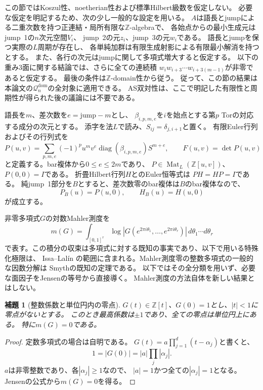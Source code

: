 \documentclass[11pt,a4paper]{ltjsarticle}
\newtheorem{lemma}[theorem]{補題}
\theoremstyle{definition}
\begin{document}
この節ではKoszul性、noetherian性および標準Hilbert級数を仮定しない。
必要な仮定を明記するため、次の少し一般的な設定を用いる。
$A$は語長とjumpによる二重次数を持つ正連結・局所有限な$\mathbb Z$-algebraで、
各始点からの最小生成元はjump~1の$n$次元空間$V_i$、
jump~2の元$z_i$、jump~3の元$w_i$である。
語長とjumpを保つ実際の$L$周期が存在し、
各単純加群は有限生成射影による有限最小解消を持つとする。
また、各行の次元はjumpに関して多項式増大すると仮定する。
以下の重み3面に関する結論では、さらに全ての連続積
$w_iw_{i+3}\cdots w_{i+3(m-1)}$が非零であると仮定する。
最後の条件は$\mathbb Z$-domain性から従う。
従って、この節の結果は本論文の$\mathcal Q_n^{\mathrm{dom}}$の全対象に適用できる。
AS双対性は、ここで明記した有限性と周期性が得られた後の議論には不要である。

語長を$m$、差次数を$e=\mathrm{jump}-m$とし、
$\beta_{i,p,m,e}$を$i$を始点とする第$p$ Torの対応する成分の次元とする。
添字を法$L$で読み、$S_{ij}=\delta_{j,i+1}$と置く。
有限Euler行列およびその行列式を
\[
 P(u,v)=\sum_{p,m,e}(-1)^p u^m v^e
       \operatorname{diag}(\beta_{i,p,m,e})S^{m+e},
 \qquad F(u,v)=\det P(u,v)
\]
と定義する。bar複体から$0\le e\le2m$であり、
$P\in\operatorname{Mat}_L(\mathbb Z[u,v])$、$P(0,0)=I$である。
折畳Hilbert行列$H$とのEuler恒等式は
$PH=HP=I$である。
純jump~1部分を$B$とすると、差次数零のbar複体は$B$のbar複体なので、
\[
 P_B(u)=P(u,0),\qquad H_B(u)=H(u,0)
\]
が成立する。

非零多項式$G$の対数Mahler測度を
\[
 m(G)=\int_{[0,1]^r}
   \log\left|G(e^{2\pi i\theta_1},\ldots,e^{2\pi i\theta_r})\right|
   \,d\theta_1\cdots d\theta_r
\]
で表す。この積分の収束は多項式に対する既知の事実であり、以下で用いる特殊化極限は、
Issa--Lal\'in \cite[Theorem~1.2, $s=1$]{IssaLalin2013}
の範囲に含まれる。Mahler測度零の整数多項式の一般的な因数分解は
Smyth\cite[Corollary 1]{Smyth1981}の既知の定理である。
以下ではその全分類を用いず、必要な面因子をJensenの等号から直接導く。
Mahler測度の方法自体を新しい結果とはしない。

\begin{lemma}[整数係数と単位円内の零点]
\label{mahler:lem:integer-disk}
$G(t)\in\mathbb Z[t]$、$G(0)=1$とし、$|t|<1$に零点がないとする。
このとき最高係数は$\pm1$であり、全ての零点は単位円上にある。
特に$m(G)=0$である。
\end{lemma}
\begin{proof}
定数多項式の場合は自明である。
$G(t)=a\prod_{j=1}^d(t-\alpha_j)$と書くと、
\[
 1=|G(0)|=|a|\prod_j|\alpha_j|.
\]
$a$は非零整数であり、各$|\alpha_j|\ge1$なので、
$|a|=1$かつ全ての$|\alpha_j|=1$となる。
Jensenの公式から$m(G)=0$を得る。
\end{proof}
\end{document}
